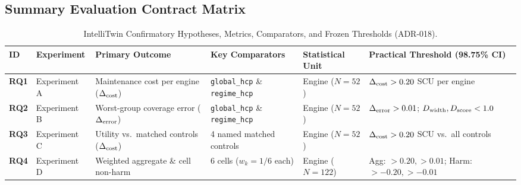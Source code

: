 \subsection*{Summary Evaluation Contract Matrix}

\begin{table}[h!]
\centering
\small
\begin{tabular}{p{0.8cm} p{1.8cm} p{2.8cm} p{2.8cm} p{2.0cm} p{3.2cm}}
\toprule
\textbf{ID} & \textbf{Experiment} & \textbf{Primary Outcome} & \textbf{Key Comparators} & \textbf{Statistical Unit} & \textbf{Practical Threshold (98.75\% CI)} \\
\midrule
\textbf{RQ1} & Experiment A & Maintenance cost per engine ($\Delta_{\text{cost}}$) & \texttt{global\_hcp} \& \texttt{regime\_hcp} & Engine ($N=52$) & $\Delta_{\text{cost}} > 0.20$ SCU per engine \\
\textbf{RQ2} & Experiment B & Worst-group coverage error ($\Delta_{\text{error}}$) & \texttt{global\_hcp} \& \texttt{regime\_hcp} & Engine ($N=52$) & $\Delta_{\text{error}} > 0.01$; $D_{\text{width}}, D_{\text{score}} < 1.0$ \\
\textbf{RQ3} & Experiment C & Utility vs.\ matched controls ($\Delta_{\text{cost}}$) & 4 named matched controls & Engine ($N=52$) & $\Delta_{\text{cost}} > 0.20$ SCU vs.\ all controls \\
\textbf{RQ4} & Experiment D & Weighted aggregate \& cell non-harm & 6 cells ($w_k = 1/6$ each) & Engine ($N=122$) & Agg: $>0.20, >0.01$; Harm: $>-0.20, >-0.01$ \\
\bottomrule
\end{tabular}
\caption{IntelliTwin Confirmatory Hypotheses, Metrics, Comparators, and Frozen Thresholds (ADR-018).}
\end{table}
